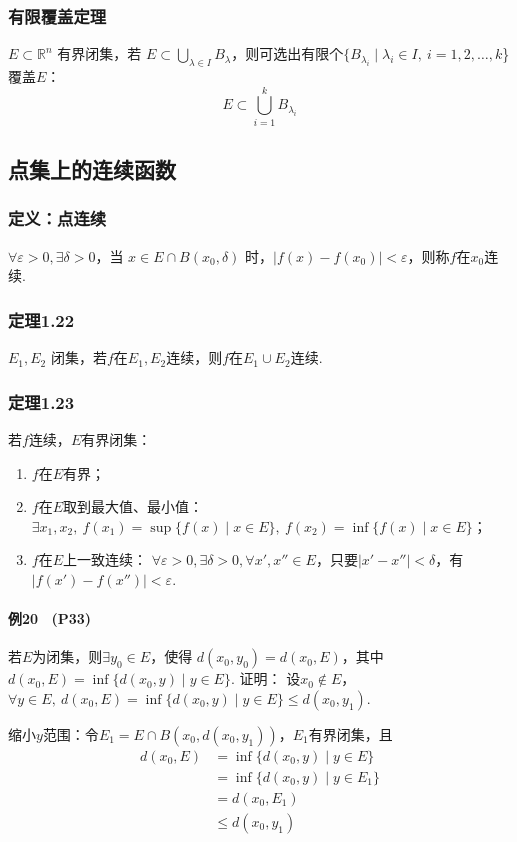 \documentclass{article}
\begin{document}
	\subsubsection{有限覆盖定理}
	$E\subset\mathbb{R}^n$ 有界闭集，若 $\displaystyle E\subset\bigcup_{\lambda\in I}B_\lambda$，则可选出有限个$\{B_{\lambda_i}\mid \lambda_i \in I,\ i=1,2,\dots,k$\}覆盖$E$：
	\[
	E\subset \bigcup_{i=1}^k B_{\lambda_i}
	\]
	
	\subsection{点集上的连续函数}
	\subsubsection{定义：点连续}
	$\forall \varepsilon>0,\exists \delta>0$，当 $x\in E\cap B(x_0,\delta)$ 时，$|f(x)-f(x_0)|<\varepsilon$，则称$f$在$x_0$连续.
	
	\subsubsection{定理1.22}
	$E_1,E_2$ 闭集，若$f$在$E_1,E_2$连续，则$f$在$E_1\cup E_2$连续.
	
	\subsubsection{定理1.23}
	若$f$连续，$E$有界闭集：
	\begin{enumerate}
		\item $f$在$E$有界；
		\item $f$在$E$取到最大值、最小值：$\exists x_1,x_2,\ f(x_1)=\sup\{f(x)\mid x\in E\},\ f(x_2)=\inf\{f(x)\mid x\in E\}$；
		\item $f$在$E$上一致连续：
		$\forall \varepsilon>0,\exists \delta>0,\forall x',x''\in E$，只要$|x'-x''|<\delta$，有$|f(x')-f(x'')|<\varepsilon$.
	\end{enumerate}
	
	\paragraph{例20 \ (P33)}
	若$E$为闭集，则$\exists y_0\in E$，使得 $d(x_0,y_0)=d(x_0,E)$，其中 $d(x_0,E)=\inf\{d(x_0,y)\mid y\in E\}$.
	证明：
	设$x_0\notin E$，$\forall y\in E,\ d(x_0,E)=\inf\{d(x_0,y)\mid y\in E\}\le d(x_0,y_1)$.
	
	缩小$y$范围：令$E_1=E\cap B(x_0,d(x_0,y_1))$，$E_1$有界闭集，且
	\[
	\begin{aligned}
		d(x_0,E)&=\inf\{d(x_0,y)\mid y\in E\}\\
		&=\inf\{d(x_0,y)\mid y\in E_1\}\\
		&=d(x_0,E_1)\\
		&\le d(x_0,y_1)
	\end{aligned}
	\]
	
\end{document}
